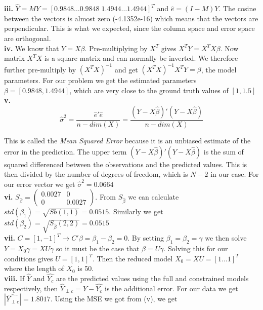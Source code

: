 \documentclass[12pt,a4paper,oneside]{report}
\begin{document}
                 
\textbf{iii.} $\hat{Y} = MY = [ 0.9848 \dots 0.9848 \; 1.4944 \dots 1.4944]^T$ and $\hat{e} = (I-M)Y$. The cosine between the vectors is almost zero (-4.1352e-16) which means that the vectors are perpendicular. This is what we expected, since the column space and error space are orthogonal.\\

\textbf{iv.} We know that $Y = X\beta$. Pre-multiplying by $X^T$ gives $X^TY = X^TX\beta$. Now matrix $X^TX$ is a square matrix and can normally be inverted. We therefore further pre-multiply by $(X^TX)^{-1}$ and get $(X^TX)^{-1}X^TY = \beta$, the model parameters. For our problem we get the estimated parameters $\beta = [0.9848, 1.4944]$, which are very close to the ground truth values of $[1, 1.5]$\\

\textbf{v.} $$\hat{\sigma}^2 = \frac{\hat{e}'\hat{e}}{n - dim(X)} = \frac{(Y - X\hat{\beta})'(Y - X\hat{\beta})}{n - dim(X)}$$

This is called the \emph{Mean Squared Error} because it is an unbiased estimate of the error in the prediction. The upper term $(Y - X\hat{\beta})'(Y - X\hat{\beta})$ is the sum of squared differenced between the observations and the predicted values. This is then divided by the number of degrees of freedom, which is $N - 2$ in our case. For our error vector we get $\hat{\sigma}^2 = 0.0664$\\

\textbf{vi.} $S_{\hat{\beta}} = \begin{pmatrix}
0.0027 & 0\\
0 & 0.0027
\end{pmatrix}$. From $S_{\hat{\beta}}$ we can calculate $std(\beta_1) = \sqrt{Sb(1,1)} = 0.0515$. Similarly we get  $std(\beta_2) = \sqrt{S_{\hat{\beta}}(2,2)} = 0.0515$\\

\textbf{vii.} $C = [1, -1]^T \to C'\beta = \beta_1 - \beta_2 = 0$. By setting $\beta_1 = \beta_2 = \gamma$ we then solve $Y = X_0\gamma = XU\gamma$ so it must be the case that $\beta = U\gamma$. Solving this for our conditions gives $U = [1, 1]^T$. Then the reduced model $X_0 = XU = [1 \dots 1]^T $ where the length of $X_0$ is 50. \\


\textbf{viii.} If $\hat{Y}$ and $\hat{Y_c}$ are the predicted values using the full and constrained models respectively, then $\hat{Y}_{\perp c} = \hat{Y} - \hat{Y_c}$ is the additional error. For our data we get $|\hat{Y_{\perp c}}| = 1.8017$. Using the MSE we got from (v), we get 
\end{document}
